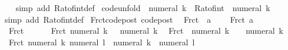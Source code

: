 \begin{isabellebody}
%
\isadelimproof
\ \ %
\endisadelimproof
%
\isatagproof
{}\isamarkupfalse%
\ {\isacharparenleft}{\kern0pt}simp\ add{\isacharcolon}{\kern0pt}\ Rat{\isachardot}{\kern0pt}of{\isacharunderscore}{\kern0pt}int{\isacharunderscore}{\kern0pt}def{\isacharparenright}{\kern0pt}%
\endisatagproof
{\isafoldproof}%
%
\isadelimproof
\isanewline
%
\endisadelimproof
\isanewline
{}\isamarkupfalse%
\ {\isacharbrackleft}{\kern0pt}code{\isacharunderscore}{\kern0pt}unfold{\isacharbrackright}{\kern0pt}{\isacharcolon}{\kern0pt}\ {\isachardoublequoteopen}{\isacharminus}{\kern0pt}\ numeral\ k\ {\isacharequal}{\kern0pt}\ Rat{\isachardot}{\kern0pt}of{\isacharunderscore}{\kern0pt}int\ {\isacharparenleft}{\kern0pt}{\isacharminus}{\kern0pt}\ numeral\ k{\isacharparenright}{\kern0pt}{\isachardoublequoteclose}\isanewline
%
\isadelimproof
\ \ %
\endisadelimproof
%
\isatagproof
{}\isamarkupfalse%
\ {\isacharparenleft}{\kern0pt}simp\ add{\isacharcolon}{\kern0pt}\ Rat{\isachardot}{\kern0pt}of{\isacharunderscore}{\kern0pt}int{\isacharunderscore}{\kern0pt}def{\isacharparenright}{\kern0pt}%
\endisatagproof
{\isafoldproof}%
%
\isadelimproof
\isanewline
%
\endisadelimproof
\isanewline
{}\isamarkupfalse%
\ Frct{\isacharunderscore}{\kern0pt}code{\isacharunderscore}{\kern0pt}post\ {\isacharbrackleft}{\kern0pt}code{\isacharunderscore}{\kern0pt}post{\isacharbrackright}{\kern0pt}{\isacharcolon}{\kern0pt}\isanewline
\ \ {\isachardoublequoteopen}Frct\ {\isacharparenleft}{\kern0pt}{}{\isacharcomma}{\kern0pt}\ a{\isacharparenright}{\kern0pt}\ {\isacharequal}{\kern0pt}\ {}{\isachardoublequoteclose}\isanewline
\ \ {\isachardoublequoteopen}Frct\ {\isacharparenleft}{\kern0pt}a{\isacharcomma}{\kern0pt}\ {}{\isacharparenright}{\kern0pt}\ {\isacharequal}{\kern0pt}\ {}{\isachardoublequoteclose}\isanewline
\ \ {\isachardoublequoteopen}Frct\ {\isacharparenleft}{\kern0pt}{}{\isacharcomma}{\kern0pt}\ {}{\isacharparenright}{\kern0pt}\ {\isacharequal}{\kern0pt}\ {}{\isachardoublequoteclose}\isanewline
\ \ {\isachardoublequoteopen}Frct\ {\isacharparenleft}{\kern0pt}numeral\ k{\isacharcomma}{\kern0pt}\ {}{\isacharparenright}{\kern0pt}\ {\isacharequal}{\kern0pt}\ numeral\ k{\isachardoublequoteclose}\isanewline
\ \ {\isachardoublequoteopen}Frct\ {\isacharparenleft}{\kern0pt}{}{\isacharcomma}{\kern0pt}\ numeral\ k{\isacharparenright}{\kern0pt}\ {\isacharequal}{\kern0pt}\ {}\ {\isacharslash}{\kern0pt}\ numeral\ k{\isachardoublequoteclose}\isanewline
\ \ {\isachardoublequoteopen}Frct\ {\isacharparenleft}{\kern0pt}numeral\ k{\isacharcomma}{\kern0pt}\ numeral\ l{\isacharparenright}{\kern0pt}\ {\isacharequal}{\kern0pt}\ numeral\ k\ {\isacharslash}{\kern0pt}\ numeral\ l{\isachardoublequoteclose}\isanewline

\end{isabellebody}

